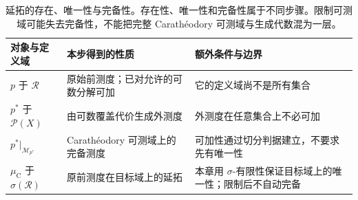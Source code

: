 \begin{table}[htbp]
\centering\small\renewcommand{\arraystretch}{1.18}\setlength{\tabcolsep}{4pt}
\caption[延拓的存在、唯一性与完备性]{延拓的存在、唯一性与完备性。存在性、唯一性和完备性属于不同步骤。限制可测域可能失去完备性，不能把完整 Carathéodory 可测域与生成代数混为一层。}
\label{b1:tab:measure-extension-objects}
\begin{tabularx}{\linewidth}{@{}>{\raggedright\arraybackslash}p{3.1cm}>{\raggedright\arraybackslash}p{4.7cm}>{\raggedright\arraybackslash}X@{}}
\toprule
对象与定义域 & 本步得到的性质 & 额外条件与边界 \\
\midrule
\(p\) 于 \(\mathcal R\) & 原始前测度；已对允许的可数分解可加 & 它的定义域尚不是所有集合 \\
\(p^*\) 于 \(\mathcal P(X)\) & 由可数覆盖代价生成外测度 & 外测度在任意集合上不必可加 \\
\(p^*|_{\mathcal M_{p^*}}\) & Carathéodory 可测域上的完备测度 & 可加性通过切分判据建立，不要求先有唯一性 \\
\(\mu_{\mathrm C}\) 于 \(\sigma(\mathcal R)\) & 原前测度在目标域上的延拓 & 本章用 \(\sigma\)-有限性保证目标域上的唯一性；限制后不自动完备 \\
\bottomrule
\end{tabularx}
\end{table}
